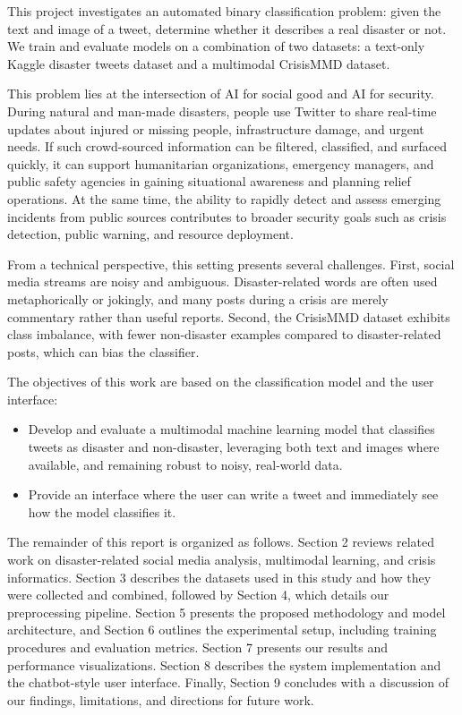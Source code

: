 \documentclass[11pt,letterpaper]{article}
\begin{document}
This project investigates an automated binary classification problem: given the text and image of a tweet, determine whether it describes a real disaster or not. We train and evaluate models on a combination of two datasets: a text-only Kaggle disaster tweets dataset and a multimodal CrisisMMD dataset.

This problem lies at the intersection of AI for social good and AI for security. During natural and man-made disasters, people use Twitter to share real-time updates about injured or missing people, infrastructure damage, and urgent needs. If such crowd-sourced information can be filtered, classified, and surfaced quickly, it can support humanitarian organizations, emergency managers, and public safety agencies in gaining situational awareness and planning relief operations. At the same time, the ability to rapidly detect and assess emerging incidents from public sources contributes to broader security goals such as crisis detection, public warning, and resource deployment.

From a technical perspective, this setting presents several challenges. First, social media streams are noisy and ambiguous. Disaster-related words are often used metaphorically or jokingly, and many posts during a crisis are merely commentary rather than useful reports. Second, the CrisisMMD dataset exhibits class imbalance, with fewer non-disaster examples compared to disaster-related posts, which can bias the classifier.

The objectives of this work are based on the classification model and the user interface:
\begin{itemize}
    \item Develop and evaluate a multimodal machine learning model that classifies tweets as disaster and non-disaster, leveraging both text and images where available, and remaining robust to noisy, real-world data.
    \item Provide an interface where the user can write a tweet and immediately see how the model classifies it.
\end{itemize}

The remainder of this report is organized as follows. Section 2 reviews related work on disaster-related social media analysis, multimodal learning, and crisis informatics. Section 3 describes the datasets used in this study and how they were collected and combined, followed by Section 4, which details our preprocessing pipeline. Section 5 presents the proposed methodology and model architecture, and Section 6 outlines the experimental setup, including training procedures and evaluation metrics. Section 7 presents our results and performance visualizations. Section 8 describes the system implementation and the chatbot-style user interface. Finally, Section 9 concludes with a discussion of our findings, limitations, and directions for future work.
\end{document}
